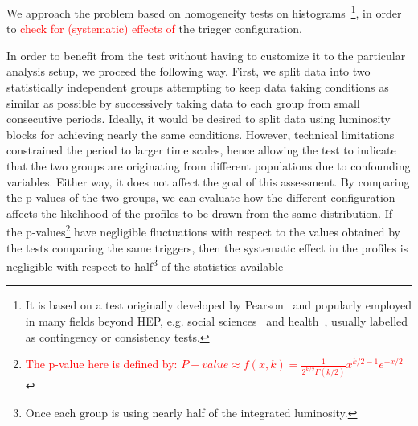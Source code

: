 We approach the problem based on homogeneity tests on histograms~\cite{homogeneity_test}\footnote{It is based on a test originally developed by Pearson~\cite{pearson1911probability} and popularly employed in many fields beyond HEP, e.g. social sciences~\cite{wickens2014multiway} and health~\cite{ma2015homogeneity}, usually labelled as contingency or consistency tests.}, in order to \textcolor{red}{check for (systematic) effects of} the trigger configuration.

In order to benefit from the test without having to customize it to the particular analysis setup, we proceed the following way. First, we split data into two
statistically independent groups attempting to keep data taking conditions as
similar as possible by successively taking data to each group from small
consecutive periods. Ideally, it would be desired to split data using luminosity
blocks for achieving nearly the same conditions. However, technical limitations
constrained the period to larger time scales, hence allowing the test to
indicate that the two groups are originating from different populations due to
confounding variables. 
Either way, it does not affect the goal of this assessment. By comparing the p-values of the two groups, we can evaluate how the different configuration affects the likelihood of the profiles to be drawn from the same distribution. If the p-values\footnote{\textcolor{red}{The p-value here is defined by: $P-value \approx f(x, k) = \frac{1}{2^{k/2}\Gamma(k/2)}x^{k/2 -1}e^{-x/2}$}} have negligible fluctuations with respect to the values obtained by the tests comparing the same triggers, then the systematic effect in the profiles is negligible with respect to half\footnote{Once each group is using nearly half of the integrated luminosity.} of the statistics available



